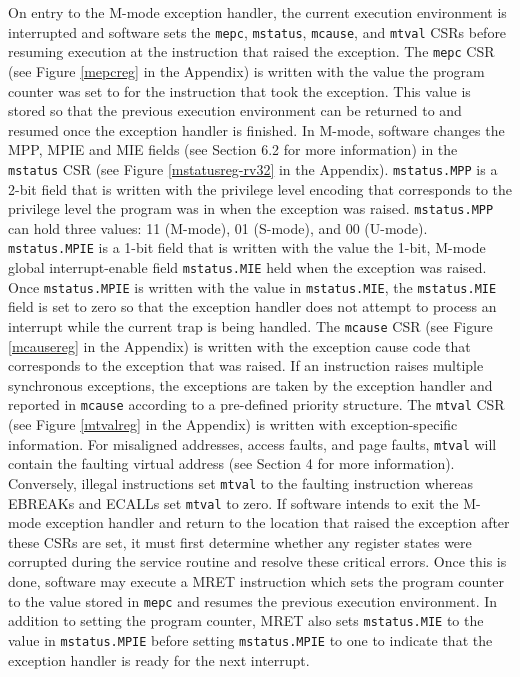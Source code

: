 \documentclass[12pt]{article}
\begin{document}
On entry to the M-mode exception handler, the current execution environment is interrupted and software sets the {\tt{mepc}}, {\tt{mstatus}}, {\tt{mcause}}, and {\tt{mtval}} CSRs before resuming execution at the instruction that raised the exception. The {\tt{mepc}} CSR (see Figure \ref{mepcreg} in the Appendix) is written with the value the program counter was set to for the instruction that took the exception. This value is stored so that the previous execution environment can be returned to and resumed once the exception handler is finished. In M-mode, software changes the MPP, MPIE and MIE fields (see Section 6.2 for more information) in the {\tt{mstatus}} CSR (see Figure \ref{mstatusreg-rv32} in the Appendix). {\tt{mstatus.MPP}} is a 2-bit field that is written with the privilege level encoding that corresponds to the privilege level the program was in when the exception was raised. {\tt{mstatus.MPP}} can hold three values: 11 (M-mode), 01 (S-mode), and 00 (U-mode). {\tt{mstatus.MPIE}} is a 1-bit field that is written with the value the 1-bit, M-mode global interrupt-enable field {\tt{mstatus.MIE}} held when the exception was raised. Once {\tt{mstatus.MPIE}} is written with the value in {\tt{mstatus.MIE}}, the {\tt{mstatus.MIE}} field is set to zero so that the exception handler does not attempt to process an interrupt while the current trap is being handled. The {\tt{mcause}} CSR (see Figure \ref{mcausereg} in the Appendix) is written with the exception cause code that corresponds to the exception that was raised. If an instruction raises multiple synchronous exceptions, the exceptions are taken by the exception handler and reported in {\tt{mcause}} according to a pre-defined priority structure. The {\tt{mtval}} CSR (see Figure \ref{mtvalreg} in the Appendix) is written with exception-specific information. For misaligned addresses, access faults, and page faults, {\tt{mtval}} will contain the faulting virtual address (see Section 4 for more information). Conversely, illegal instructions set {\tt{mtval}} to the faulting instruction whereas EBREAKs and ECALLs set {\tt{mtval}} to zero. If software intends to exit the M-mode exception handler and return to the location that raised the exception after these CSRs are set, it must first determine whether any register states were corrupted during the service routine and resolve these critical errors. Once this is done, software may execute a MRET instruction which sets the program counter to the value stored in {\tt{mepc}} and resumes the previous execution environment. In addition to setting the program counter, MRET also sets {\tt{mstatus.MIE}} to the value in {\tt{mstatus.MPIE}} before setting {\tt{mstatus.MPIE}} to one to indicate that the exception handler is ready for the next interrupt. 
\end{document}
